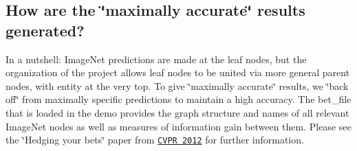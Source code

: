 \subsection*{How are the \char`\"{}maximally accurate\char`\"{} results generated?}

In a nutshell\+: Image\+Net predictions are made at the leaf nodes, but the organization of the project allows leaf nodes to be united via more general parent nodes, with \textquotesingle{}entity\textquotesingle{} at the very top. To give \char`\"{}maximally accurate\char`\"{} results, we \char`\"{}back off\char`\"{} from maximally specific predictions to maintain a high accuracy. The {\ttfamily bet\+\_\+file} that is loaded in the demo provides the graph structure and names of all relevant Image\+Net nodes as well as measures of information gain between them. Please see the \char`\"{}\+Hedging your bets\char`\"{} paper from \href{http://www.image-net.org/projects/hedging/}{\tt C\+V\+PR 2012} for further information. 
